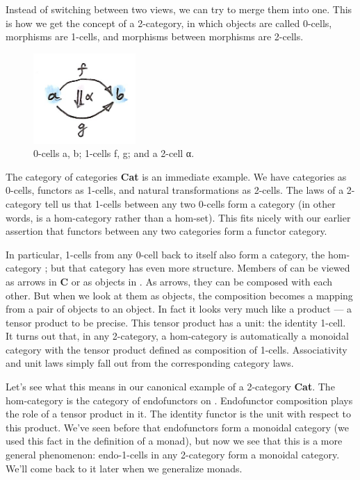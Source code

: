 Instead of switching between two views, we can try to merge them into
one. This is how we get the concept of a 2-category, in which objects
are called 0-cells, morphisms are 1-cells, and morphisms between
morphisms are 2-cells.

\begin{figure}[H]
\centering
\includegraphics[width=1.53125in]{images/twocat.png}
\caption{0-cells a, b; 1-cells f, g; and a 2-cell α.}
\end{figure}

\noindent
The category of categories \textbf{Cat} is an immediate example. We have
categories as 0-cells, functors as 1-cells, and natural transformations
as 2-cells. The laws of a 2-category tell us that 1-cells between any
two 0-cells form a category (in other words,  is a
hom-category rather than a hom-set). This fits nicely with our earlier
assertion that functors between any two categories form a functor
category.

In particular, 1-cells from any 0-cell back to itself also form a
category, the hom-category ; but that category has even
more structure. Members of  can be viewed as arrows in
\textbf{C} or as objects in . As arrows, they can be
composed with each other. But when we look at them as objects, the
composition becomes a mapping from a pair of objects to an object. In
fact it looks very much like a product --- a tensor product to be
precise. This tensor product has a unit: the identity 1-cell. It turns
out that, in any 2-category, a hom-category  is
automatically a monoidal category with the tensor product defined as
composition of 1-cells. Associativity and unit laws simply fall out from
the corresponding category laws.

Let's see what this means in our canonical example of a 2-category
\textbf{Cat}. The hom-category  is the category of
endofunctors on . Endofunctor composition plays the role of a
tensor product in it. The identity functor is the unit with respect to
this product. We've seen before that endofunctors form a monoidal
category (we used this fact in the definition of a monad), but now we
see that this is a more general phenomenon: endo-1-cells in any
2-category form a monoidal category. We'll come back to it later when we
generalize monads.

